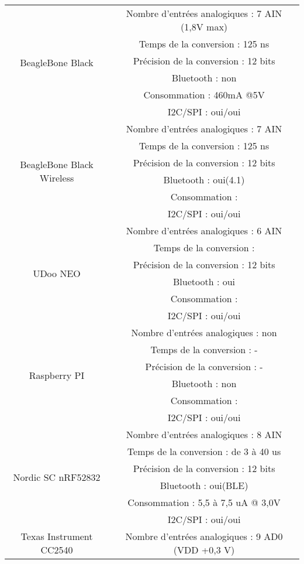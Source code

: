 \documentclass{report}
\begin{document}
\begin{tabular}{|c|c|}
\hline
\multirow{6}{*}{BeagleBone Black}
& Nombre d’entr\'{e}es analogiques : 7 AIN (1,8V max) \\ 
& Temps de la conversion : 125 ns\\ 
& Pr\'{e}cision de la conversion : 12 bits \\ 
& Bluetooth : non \\ 
& Consommation : 460mA @5V \\ 
& I2C/SPI : oui/oui \\ \hline
\multirow{6}{*}{BeagleBone Black Wireless} 
& Nombre d’entr\'{e}es analogiques : 7 AIN  \\ 
& Temps de la conversion : 125 ns\\ 
& Pr\'{e}cision de la conversion : 12 bits \\ 
& Bluetooth : oui(4.1) \\ 
& Consommation :  \\ 
& I2C/SPI : oui/oui \\ \hline
\multirow{6}{*}{UDoo NEO} 
& Nombre d’entr\'{e}es analogiques : 6 AIN  \\ 
& Temps de la conversion : \\ 
& Pr\'{e}cision de la conversion : 12 bits \\ 
& Bluetooth : oui \\ & Consommation :  \\ 
& I2C/SPI : oui/oui \\ \hline
\multirow{6}{*}{Raspberry PI} 
& Nombre d’entr\'{e}es analogiques : non  \\ 
& Temps de la conversion : -\\ 
& Pr\'{e}cision de la conversion : - \\ 
& Bluetooth : non \\ 
& Consommation :  \\ 
& I2C/SPI : oui/oui \\ \hline
\multirow{6}{*}{Nordic SC nRF52832} 
& Nombre d’entr\'{e}es analogiques : 8 AIN  \\ 
& Temps de la conversion : de 3 \`{a} 40 us\\ 
& Pr\'{e}cision de la conversion : 12 bits \\ 
& Bluetooth : oui(BLE) \\ 
& Consommation : 5,5 \`{a} 7,5 uA @ 3,0V\\ 
& I2C/SPI : oui/oui \\ \hline
\multirow{6}{*}{Texas Instrument CC2540} 
& Nombre d’entr\'{e}es analogiques : 9 AD0 (VDD +0,3 V)  \\ 

\end{tabular}
\end{document}
